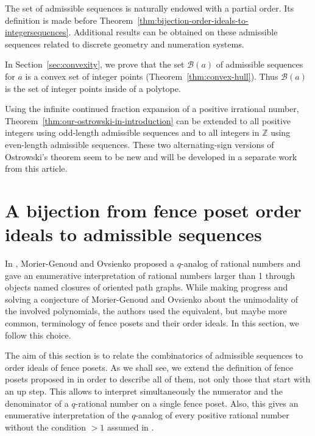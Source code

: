 \documentclass[a4paper,12pt]{amsart}
\newcommand{\Z}{\mathbb{Z}}
\newcommand{\Bcal}{{\mathcal{B}}}
\newcommand{\0}{\mathtt{0}}
\newcommand{\1}{\mathtt{1}}
\newcommand{\2}{\mathtt{2}}
\newcommand{\3}{\mathtt{3}}
\begin{document}
%
%
%
%
%
%
%
%
%
%
%
%
%
%
%
%
%
%
%
%
%
%
%
%
%
%
%
%
%
%
%

The set of admissible sequences is naturally endowed with a partial order.
Its definition is made before Theorem~\ref{thm:bijection-order-ideals-to-integersequences}.
Additional results can be obtained on these admissible sequences
related to discrete geometry and numeration systems.

In Section~\ref{sec:convexity}, we prove that the set $\Bcal(a)$ of admissible
sequences for $a$ is a convex set of integer points (Theorem~\ref{thm:convex-hull}).
Thus $\Bcal(a)$ is the set of integer points inside of a polytope.

Using the infinite continued fraction expansion of a positive irrational number,
Theorem~\ref{thm:our-ostrowski-in-introduction} can be extended
to all positive integers using odd-length admissible sequences
%
and
to all integers in $\Z$ using even-length admissible sequences.
%
These two alternating-sign versions of Ostrowski's theorem seem to be new and
will be developed in a separate work from this article.



\section{A bijection from fence poset order ideals to admissible sequences}
\label{sec:bijection-order-ideals-admissible}

In \cite{MR4073883}, Morier-Genoud and Ovsienko
proposed a $q$-analog of rational numbers and
gave an enumerative interpretation of rational numbers larger than 1
through objects named
closures of oriented path graphs.
While making progress \cite{MR4266256} and solving
\cite{MR4499341} a conjecture of Morier-Genoud and
Ovsienko about the unimodality of the involved polynomials, the authors
used the equivalent, but maybe more common, terminology of fence posets and their
order ideals. In this section, we follow this choice.

The aim of this section is to relate the combinatorics of admissible sequences
to order ideals of fence posets.
As we shall see, we extend the definition of fence posets proposed in
\cite{MR4266256,MR4499341} in order to describe all of them, not only those
that start with an up step.
This allows to interpret simultaneously the numerator and the denominator
of a $q$-rational number on a single fence poset.
Also, this gives an enumerative interpretation of the $q$-analog of
every positive rational number without the condition $>1$ assumed in \cite{MR4073883}.
\end{document}
